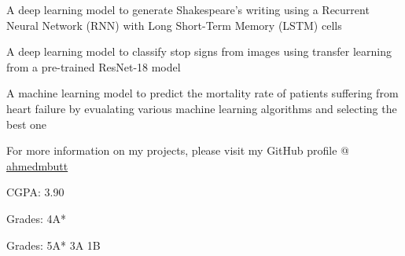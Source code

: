 \documentclass[10pt,a4paper,ragged2e,withhyper]{altacv}
\begin{document}
\begin{paracol}{2}
A deep learning model to generate Shakespeare's writing using a Recurrent Neural Network (RNN) with Long Short-Term Memory (LSTM) cells

\divider

A deep learning model to classify stop signs from images using transfer learning from a pre-trained ResNet-18 model

\divider

A machine learning model to predict the mortality rate of patients suffering from heart failure by evualating various machine learning algorithms and selecting the best one

\divider

For more information on my projects, please visit my GitHub profile @ \href{https://github.com/ahmedmbutt}{ahmedmbutt}

\switchcolumn


CGPA: 3.90

\divider

Grades: 4A*

\divider

Grades: 5A* 3A 1B


\\

\smallskip

\\

\smallskip

\\

\smallskip

\\




\end{paracol}
\end{document}
